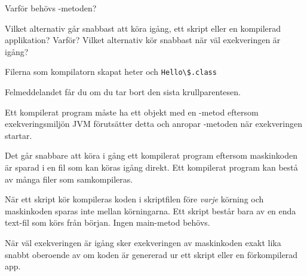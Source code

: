 \Subtask Varför behövs -metoden?

\Subtask Vilket alternativ går snabbast att köra igång, ett skript eller en kompilerad applikation? Varför? Vilket alternativ kör snabbast när väl exekveringen är igång?


\SOLUTION


\TaskSolved \what


\SubtaskSolved  Filerna som kompilatorn skapat heter  och \verb+Hello\$.class+

\SubtaskSolved  Felmeddelandet får du om du tar bort den sista krullparentesen.

\SubtaskSolved Ett kompilerat program måste ha ett objekt med en -metod eftersom exekveringsmiljön JVM förutsätter detta och anropar -metoden när exekveringen startar.

\SubtaskSolved
  Det går snabbare att köra i gång ett kompilerat program eftersom maskinkoden är sparad i en fil som kan köras igång direkt.  Ett kompilerat program kan bestå av många filer som samkompileras.

  När ett skript kör kompileras koden i skriptfilen före \emph{varje} körning och maskinkoden sparas inte mellan körningarna. Ett skript består bara av en enda text-fil som körs från början. Ingen main-metod behövs.

  När väl exekveringen är igång sker exekveringen av maskinkoden exakt lika snabbt oberoende av om koden är genererad ur ett skript eller en förkompilerad app.


\QUESTEND












